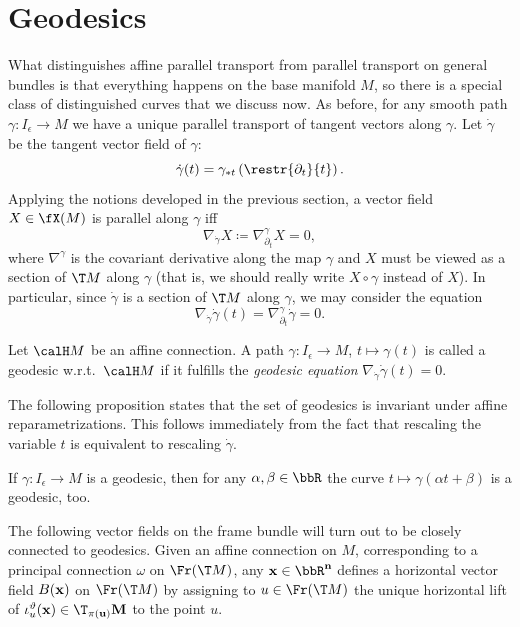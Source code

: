 \section{Geodesics}


What distinguishes affine parallel transport from parallel transport on general bundles is that everything happens on the base manifold $M$, so there is a special class of distinguished curves that we discuss now. As before, for any smooth path $\gamma:I_\epsilon\to M$ we have a unique parallel transport of tangent vectors along $\gamma$. Let $\dot\gamma$ be the tangent vector field of $\gamma$:
\[\dot\gamma(t)=\gamma_{\ast t}\left(\restr{\partial_t}{t}\right).\]
Applying the notions developed in the previous section, a vector field $X\in \fX(M)$ is parallel along $\gamma$ iff 
\[\nabla_{\dot\gamma}X\coloneqq \nabla^\gamma_{\partial_t}X=0,\label{eq 2.1.34 RS2}\]
where $\nabla^\gamma$ is the covariant derivative along the map $\gamma$ and $X$ must be viewed as a section of $\T M$ along $\gamma$ (that is, we should really write $X\circ\gamma$ instead of $X$). In particular, since $\dot\gamma$ is a section of $\T M$ along $\gamma$, we may consider the equation 
\[\nabla_{\dot\gamma}\dot\gamma(t)=\nabla^\gamma_{\partial_t}\dot\gamma=0.\label{eq 2.1.35 RS2}\] 

\begin{defn}[Geodesic]
    Let $\calH M$ be an affine connection. A path $\gamma:I_\epsilon\to M$, $t\mapsto \gamma(t)$ is called a geodesic w.r.t.\ $\calH M$ if it fulfills the \emph{geodesic equation} $\nabla_{\dot\gamma}\dot\gamma(t)=0$.
\end{defn}

The following proposition states that the set of geodesics is invariant under affine reparametrizations. This follows immediately from the fact that rescaling the variable $t$ is equivalent to rescaling $\dot\gamma$.
\begin{prop}[{{\cite[Prop.~2.1.21]{RS2}}}]\label{prop 2.1.21 RS2}
    If $\gamma:I_\epsilon\to M$ is a geodesic, then for any $\alpha,\beta\in\bbR$ the curve $t\mapsto \gamma(\alpha t+\beta)$ is a geodesic, too.
\end{prop}


The following vector fields on the frame bundle will turn out to be closely connected to geodesics. Given an affine connection on $M$, corresponding to a principal connection $\omega$ on $\Fr(\T M)$, any $\bf{x}\in\bbR^n$ defines a horizontal vector field $B(\bf{x})$ on $\Fr(\T M)$ by assigning to $u\in\Fr(\T M)$ the unique horizontal lift of $\iota_u^\vartheta(\bf{x})\in \T_{\pi(u)}M$ to the point $u$.

